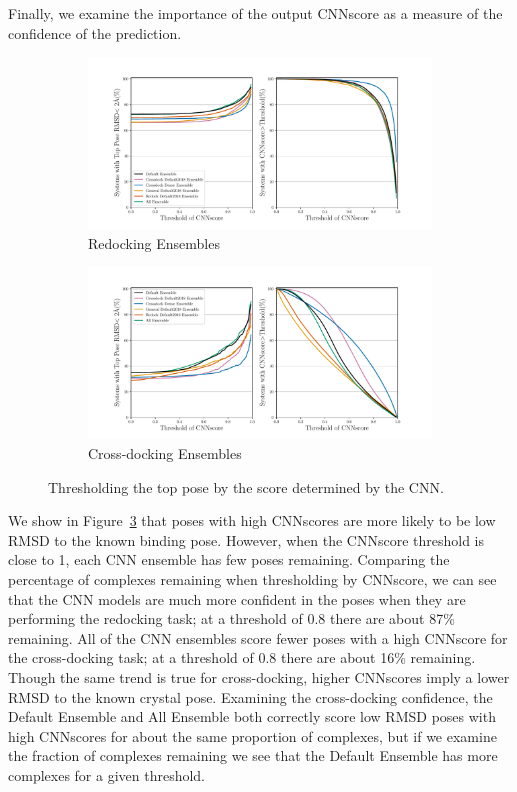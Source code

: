 \documentclass[journal=jcisd8,manuscript=article]{achemso}
\begin{document}
Finally, we examine the importance of the output CNNscore as a measure of the confidence of the prediction. 
\begin{figure}    
        \begin{subfigure}[b]{\textwidth}    
		\centering
		\includegraphics[width=\textwidth]{figures/redocking/thresh_cnnscore_ensembles.pdf}
		\caption{Redocking Ensembles}
		\label{fig:ThreshEnsRD}
        \end{subfigure}    
        \begin{subfigure}[b]{\textwidth}    
		\centering
		\includegraphics[width=\textwidth]{figures/crossdocking/thresh_cnnscore_ensembles.pdf}
		\caption{Cross-docking Ensembles}
                \label{fig:ThreshEnsCD}
        \end{subfigure}
	\caption{Thresholding the top pose by the score determined by the CNN.}
	\label{fig:ScoreThresh}
\end{figure} 

We show in Figure~\ref{fig:ScoreThresh} that poses with high CNNscores are more likely to be low RMSD to the known binding pose. However, when the CNNscore threshold is close to 1, each CNN ensemble has few poses remaining. Comparing the percentage of complexes remaining when thresholding by CNNscore, we can see that the CNN models are much more confident in the poses when they are performing the redocking task; at a threshold of 0.8 there are about 87\% remaining. All of the CNN ensembles score fewer poses with a high CNNscore for the cross-docking task; at a threshold of 0.8 there are about 16\% remaining. Though the same trend is true for cross-docking, higher CNNscores imply a lower RMSD to the known crystal pose. Examining the cross-docking confidence, the Default Ensemble and All Ensemble both correctly score low RMSD poses with high CNNscores for about the same proportion of complexes, but if we examine the fraction of complexes remaining we see that the Default Ensemble has more complexes for a given threshold.
\end{document}
